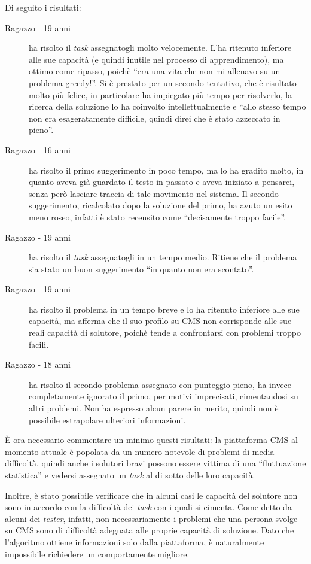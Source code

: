 \documentclass[12pt,a4paper]{article}
\theoremstyle{thm}
\theoremstyle{def}
\begin{document}
Di seguito i risultati:
\begin{description}
\item[{\sc Ragazzo - 19 anni}] ha risolto il \textit{task} assegnatogli molto velocemente. L'ha ritenuto inferiore alle sue capacità (e quindi inutile nel processo di apprendimento), ma ottimo come ripasso, poichè ``era una vita che non mi allenavo su un problema greedy!''. Si è prestato per un secondo tentativo, che è risultato molto più felice, in particolare ha impiegato più tempo per risolverlo, la ricerca della soluzione lo ha coinvolto intellettualmente e ``allo stesso tempo non era esageratamente difficile, quindi direi che è stato azzeccato in pieno''.
\item[{\sc Ragazzo - 16 anni}] ha risolto il primo suggerimento in poco tempo, ma lo ha gradito molto, in quanto aveva già guardato il testo in passato e aveva iniziato a pensarci, senza però lasciare traccia di tale movimento nel sistema. Il secondo suggerimento, ricalcolato dopo la soluzione del primo, ha avuto un esito meno roseo, infatti è stato recensito come ``decisamente troppo facile''.
\item[{\sc Ragazzo - 19 anni}] ha risolto il \textit{task} assegnatogli in un tempo medio. Ritiene che il problema sia stato un buon suggerimento ``in quanto non era scontato''.
\item[{\sc Ragazzo - 19 anni}] ha risolto il problema in un tempo breve e lo ha ritenuto inferiore alle sue capacità, ma afferma che il suo profilo su CMS non corrisponde alle sue reali capacità di solutore, poichè tende a confrontarsi con problemi troppo facili.
\item[{\sc Ragazzo - 18 anni}] ha risolto il secondo problema assegnato con punteggio pieno, ha invece completamente ignorato il primo, per motivi imprecisati, cimentandosi su altri problemi. Non ha espresso alcun parere in merito, quindi non è possibile estrapolare ulteriori informazioni.
\end{description}

È ora necessario commentare un minimo questi risultati: la piattaforma CMS al momento attuale è popolata da un numero notevole di problemi di media difficoltà, quindi anche i solutori bravi possono essere vittima di una ``fluttuazione statistica'' e vedersi assegnato un \textit{task} al di sotto delle loro capacità.

Inoltre, è stato possibile verificare che in alcuni casi le capacità del solutore non sono in accordo con la difficoltà dei \textit{task} con i quali si cimenta. Come detto da alcuni dei \textit{tester}, infatti, non necessariamente i problemi che una persona svolge su CMS sono di difficoltà adeguata alle proprie capacità di soluzione. Dato che l'algoritmo ottiene informazioni solo dalla piattaforma, è naturalmente impossibile richiedere un comportamente migliore.
\end{document}
